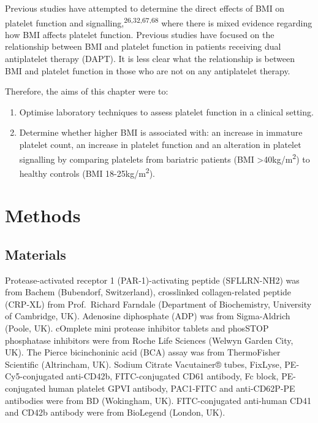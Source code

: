 \documentclass[11pt,twoside]{bristolthesis}
\providecommand{\tightlist}{%
  \setlength{\itemsep}{0pt}\setlength{\parskip}{0pt}}
\begin{document}
Previous studies have attempted to determine the direct effects of BMI on platelet function and signalling,\textsuperscript{26,32,67,68} where there is mixed evidence regarding how BMI affects platelet function. Previous studies have focused on the relationship between BMI and platelet function in patients receiving dual antiplatelet therapy (DAPT). It is less clear what the relationship is between BMI and platelet function in those who are not on any antiplatelet therapy.

Therefore, the aims of this chapter were to:
\begin{enumerate}
\def\labelenumi{\arabic{enumi})}
\tightlist
\item
  Optimise laboratory techniques to assess platelet function in a clinical setting.
\item
  Determine whether higher BMI is associated with: an increase in immature platelet count, an increase in platelet function and an alteration in platelet signalling by comparing platelets from bariatric patients (BMI \textgreater40kg/m\textsuperscript{2}) to healthy controls (BMI 18-25kg/m\textsuperscript{2}).
\end{enumerate}
\hypertarget{methods-1}{%
\section{Methods}\label{methods-1}}

\hypertarget{materials}{%
\subsection{Materials}\label{materials}}

Protease-activated receptor 1 (PAR-1)-activating peptide (SFLLRN-NH2) was from Bachem (Bubendorf, Switzerland), crosslinked collagen-related peptide (CRP-XL) from Prof.~Richard Farndale (Department of Biochemistry, University of Cambridge, UK). Adenosine diphosphate (ADP) was from Sigma-Aldrich (Poole, UK). cOmplete mini protease inhibitor tablets and phosSTOP phosphatase inhibitors were from Roche Life Sciences (Welwyn Garden City, UK). The Pierce bicinchoninic acid (BCA) assay was from ThermoFisher Scientific (Altrincham, UK). Sodium Citrate Vacutainer® tubes, FixLyse, PE-Cy5-conjugated anti-CD42b, FITC-conjugated CD61 antibody, Fc block, PE-conjugated human platelet GPVI antibody, PAC1-FITC and anti-CD62P-PE antibodies were from BD (Wokingham, UK). FITC-conjugated anti-human CD41 and CD42b antibody were from BioLegend (London, UK).
\end{document}
